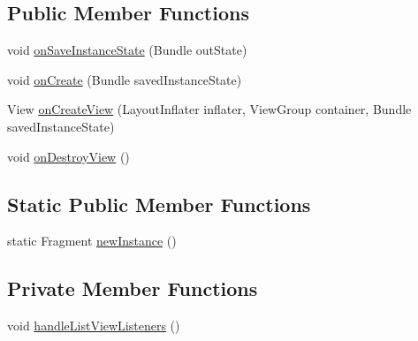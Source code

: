 \subsection*{Public Member Functions}
\begin{DoxyCompactItemize}
\item 
void \hyperlink{classorg_1_1buildmlearn_1_1toolkit_1_1matchtemplate_1_1fragment_1_1DetailFragment_afd551354a42fea424ac4a21a1706aedc}{on\+Save\+Instance\+State} (Bundle out\+State)
\item 
void \hyperlink{classorg_1_1buildmlearn_1_1toolkit_1_1matchtemplate_1_1fragment_1_1DetailFragment_a8a3b04bc47ac3353ba4425ab56de02b6}{on\+Create} (Bundle saved\+Instance\+State)
\item 
View \hyperlink{classorg_1_1buildmlearn_1_1toolkit_1_1matchtemplate_1_1fragment_1_1DetailFragment_ad14e2a781f04fc2087a3e8f7f2f712b4}{on\+Create\+View} (Layout\+Inflater inflater, View\+Group container, Bundle saved\+Instance\+State)
\item 
void \hyperlink{classorg_1_1buildmlearn_1_1toolkit_1_1matchtemplate_1_1fragment_1_1DetailFragment_a51c9eaac8b23c73d8a2cf14e94a20a04}{on\+Destroy\+View} ()
\end{DoxyCompactItemize}
\subsection*{Static Public Member Functions}
\begin{DoxyCompactItemize}
\item 
static Fragment \hyperlink{classorg_1_1buildmlearn_1_1toolkit_1_1matchtemplate_1_1fragment_1_1DetailFragment_a7e9a5f6590b69d3264e33eee55b939eb}{new\+Instance} ()
\end{DoxyCompactItemize}
\subsection*{Private Member Functions}
\begin{DoxyCompactItemize}
\item 
void \hyperlink{classorg_1_1buildmlearn_1_1toolkit_1_1matchtemplate_1_1fragment_1_1DetailFragment_ab5f363c69800d37c31d4d4b9bb72ff16}{handle\+List\+View\+Listeners} ()
\end{DoxyCompactItemize}
